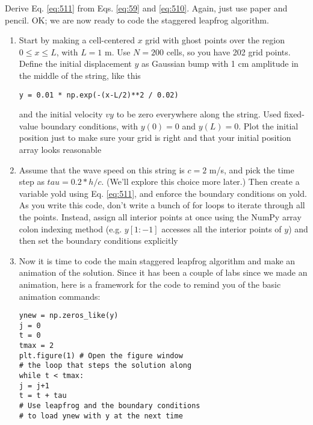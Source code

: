 \begin{problem}\label{P5.2} Derive Eq. \eqref{eq:511} from Eqs. \eqref{eq:59} and \eqref{eq:510}. Again, just use paper and pencil.
OK; we are now ready to code the staggered leapfrog algorithm.\end{problem}
\begin{problem}\label{P5.3} 

\begin{enumerate}[label=(\alph*)]
\item Start by making a cell-centered $x$ grid with ghost points over the region
$0 \leq x \leq L$, with $L = 1$ m. Use $N = 200$ cells, so you have 202 grid
points. Define the initial displacement $y$ as Gaussian bump with 1 cm
amplitude in the middle of the string, like this
\begin{lstlisting}
y = 0.01 * np.exp(-(x-L/2)**2 / 0.02)
\end{lstlisting}
and the initial velocity $vy$ to be zero everywhere along the string. Used
fixed-value boundary conditions, with $y(0) = 0$ and $y(L) = 0$. Plot the
initial position just to make sure your grid is right and that your initial
position array looks reasonable
\item Assume that the wave speed on this string is $c = 2$ m/s, and pick
the time step as $tau = 0.2*h/c$. (We\rq ll explore this choice more
later.) Then create a variable yold using Eq. \eqref{eq:511}, and enforce the boundary conditions on yold. As you write this code, don\rq t write a
bunch of for loops to iterate through all the points. Instead, assign all
interior points at once using the NumPy array colon indexing method
(e.g. $y[1:-1]$ accesses all the interior points of $y$) and then set the
boundary conditions explicitly
\item Now it is time to code the main staggered leapfrog algorithm and make
an animation of the solution. Since it has been a couple of labs since
we made an animation, here is a framework for the code to remind
you of the basic animation commands:
\begin{lstlisting}
ynew = np.zeros_like(y)
j = 0
t = 0
tmax = 2
plt.figure(1) # Open the figure window
# the loop that steps the solution along
while t < tmax:
j = j+1
t = t + tau
# Use leapfrog and the boundary conditions
# to load ynew with y at the next time

\end{lstlisting}
\end{enumerate}
\end{problem}
